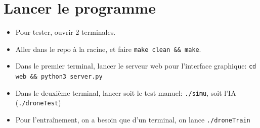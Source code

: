 \documentclass{article}
\begin{document}
\section{Lancer le programme}

\begin{itemize}
    \item Pour tester, ouvrir 2 terminales.
    \item Aller dans le repo à la racine, et faire \texttt{make clean \&\& make}.
    \item Dans le premier terminal, lancer le serveur web pour l'interface graphique: \texttt{cd web \&\& python3 server.py}
    \item Dans le deuxième terminal, lancer soit le test manuel: \texttt{./simu}, soit l'IA (\texttt{./droneTest})
    \item Pour l'entraînement, on a besoin que d'un terminal, on lance \texttt{./droneTrain}
\end{itemize}
\end{document}
